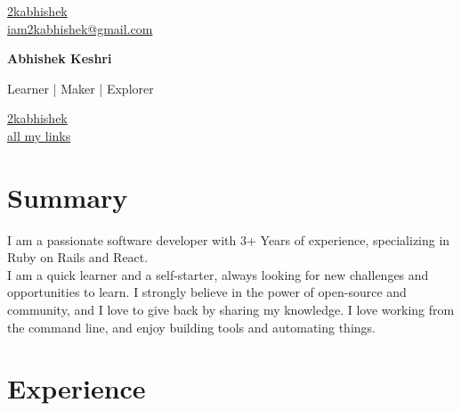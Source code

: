 \documentclass[11pt]{article} %
\begin{document}
\begin{multicols}{3}
  \begin{flushleft}
    \color{gray}{\faGithub} \href{https://github.com/2kabhishek}{2kabhishek} \\
    \color{gray}{\faEnvelope} \href{mailto:iam2kabhishek@gmail.com}{iam2kabhishek@gmail.com} \\
  \end{flushleft}

\columnbreak

  \begin{center}
      {\huge\bfseries Abhishek Keshri} \par
      Learner | Maker | Explorer \par
  \end{center}

\columnbreak

  \begin{flushright}
    \href{https://www.linkedin.com/in/2kabhishek/}{2kabhishek} {\color{gray}{\faLinkedin}} \\
    \href{https://2kabhishek.github.io/links}{all my links} {\textcolor{gray}{\faLink}} \\
  \end{flushright}
\end{multicols}

\section{Summary}
I am a passionate software developer with 3+ Years of experience, specializing in Ruby on Rails and React. \\
I am a quick learner and a self-starter, always looking for new challenges and opportunities to learn.
I strongly believe in the power of open-source and community, and I love to give back by sharing my knowledge.
I love working from the command line, and enjoy building tools and automating things.

\section{Experience}
\end{document}
